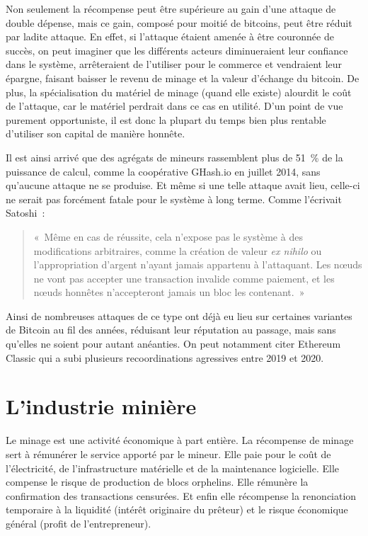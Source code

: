 Non seulement la récompense peut être supérieure au gain d'une attaque de double dépense, mais ce gain, composé pour moitié de bitcoins, peut être réduit par ladite attaque. En effet, si l'attaque étaient amenée à être couronnée de succès, on peut imaginer que les différents acteurs diminueraient leur confiance dans le système, arrêteraient de l'utiliser pour le commerce et vendraient leur épargne, faisant baisser le revenu de minage et la valeur d'échange du bitcoin. De plus, la spécialisation du matériel de minage (quand elle existe) alourdit le coût de l'attaque, car le matériel perdrait dans ce cas en utilité. D'un point de vue purement opportuniste, il est donc la plupart du temps bien plus rentable d'utiliser son capital de manière honnête.

Il est ainsi arrivé que des agrégats de mineurs rassemblent plus de 51~\% de la puissance de calcul, comme la coopérative GHash.io en juillet 2014, sans qu'aucune attaque ne se produise. Et même si une telle attaque avait lieu, celle-ci ne serait pas forcément fatale pour le système à long terme. Comme l'écrivait Satoshi~:

\begin{quote}
«~Même en cas de réussite, cela n'expose pas le système à des modifications arbitraires, comme la création de valeur \emph{ex nihilo} ou l'appropriation d'argent n'ayant jamais appartenu à l'attaquant. Les nœuds ne vont pas accepter une transaction invalide comme paiement, et les nœuds honnêtes n'accepteront jamais un bloc les contenant.~»
\end{quote}

Ainsi de nombreuses attaques de ce type ont déjà eu lieu sur certaines variantes de Bitcoin au fil des années, réduisant leur réputation au passage, mais sans qu'elles ne soient pour autant anéanties. On peut notamment citer Ethereum Classic qui a subi plusieurs recoordinations agressives entre 2019 et 2020.

\section*{L'industrie minière}

Le minage est une activité économique à part entière. La récompense de minage sert à rémunérer le service apporté par le mineur. Elle paie pour le coût de l'électricité, de l'infrastructure matérielle et de la maintenance logicielle. Elle compense le risque de production de blocs orphelins. Elle rémunère la confirmation des transactions censurées. Et enfin elle récompense la renonciation temporaire à la liquidité (intérêt originaire du prêteur) et le risque économique général (profit de l'entrepreneur).


